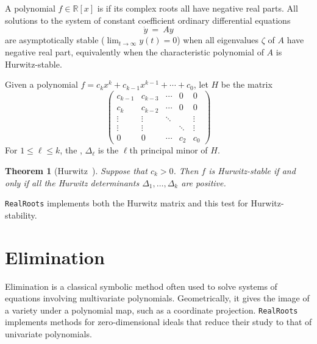 \documentclass[12pt]{amsart}
\newtheorem{theorem}{Theorem}
\theoremstyle{definition}
\newcommand{\RR}{\mathbb{R}}
\newcommand{\defcolor}[1]{{\color{TAMU}#1}}
\newcommand{\demph}[1]{\defcolor{{\sl #1}}}
\begin{document}
A polynomial $f\in\RR[x]$ is \demph{Hurwitz-stable} if its complex roots all have negative real parts.
All solutions to the system of constant coefficient ordinary differential equations 
%
 \[
  \dot{y}\ =\ Ay
 \]
%
are asymptotically stable ($\lim_{t\to\infty}y(t)=0$) when all eigenvalues $\zeta$ of $A$ have negative real part,
equivalently when the characteristic polynomial of $A$ is Hurwitz-stable.
 
Given a polynomial $f=c_kx^k+c_{k-1}x^{k-1}+\dotsb+c_0$,  let \defcolor{$H$} be the matrix
\[
\left(\begin{matrix}
  c_{k-1} & c_{k-3} & \dotsb & 0  & 0 \\
  c_k    & c_{k-2} &  \dotsb& 0 & 0 \\
  \vdots & \vdots & \ddots&    &\vdots\\
  \vdots & \vdots & & \ddots&\vdots\\
    0    &    0   & \dotsb&c_2 & c_0
\end{matrix}\right)
\]
For $1\leq \ell\leq k$, the \demph{Hurwitz determinant}, \defcolor{$\Delta_\ell$} is the $\ell$th principal minor of $H$.


\begin{theorem}[Hurwitz~\cite{Hurwitz}]
  Suppose that $c_k>0$.
  Then $f$ is Hurwitz-stable if and only if all the Hurwitz determinants $\Delta_{1},\dots,\Delta_{k}$ are positive.
\end{theorem}

\texttt{RealRoots} implements both the Hurwitz matrix and this test for Hurwitz-stability.
%
\begin{leftbar}

\end{leftbar}
%



\section{Elimination}\label{S:two}

Elimination is a classical symbolic method often used to solve systems of equations involving multivariate polynomials.
Geometrically, it gives the image of a variety under a polynomial map, such as a coordinate projection.
\texttt{RealRoots} implements methods for zero-dimension\-al ideals that reduce their study to that of univariate polynomials.
\end{document}
